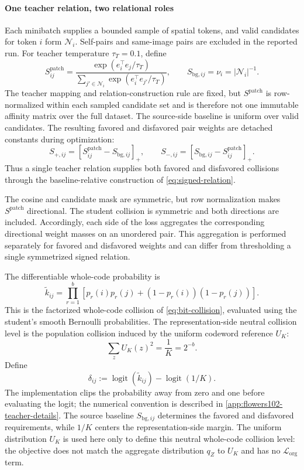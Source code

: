 \paragraph{One teacher relation, two relational roles}
Each minibatch supplies a bounded sample of spatial tokens, and valid candidates for token $i$ form $\mathcal N_i$.
Self-pairs and same-image pairs are excluded in the reported run.
For teacher temperature $\tau_T=0.1$, define
\begin{equation}
S^{\mathrm{patch}}_{ij}
=\frac{\exp(e_i^\top e_j/\tau_T)}
{\sum_{j'\in\mathcal N_i}\exp(e_i^\top e_{j'}/\tau_T)},
\qquad
S_{\mathrm{bg},ij}=\nu_i=|\mathcal N_i|^{-1}.
\label{eq:teacher-row-relation}
\end{equation}
The teacher mapping and relation-construction rule are fixed, but $S^{\mathrm{patch}}$ is row-normalized within each sampled candidate set and is therefore not one immutable affinity matrix over the full dataset.
The source-side baseline is uniform over valid candidates.
The resulting favored and disfavored pair weights are detached constants during optimization:
\begin{equation}
S_{+,ij}=[S^{\mathrm{patch}}_{ij}-S_{\mathrm{bg},ij}]_+,\qquad
S_{-,ij}=[S_{\mathrm{bg},ij}-S^{\mathrm{patch}}_{ij}]_+.
\label{eq:teacher-signed-weights}
\end{equation}
Thus a single teacher relation supplies both favored and disfavored collisions through the baseline-relative construction of \cref{eq:signed-relation}.

The cosine and candidate mask are symmetric, but row normalization makes $S^{\mathrm{patch}}$ directional.
The student collision is symmetric and both directions are included.
Accordingly, each side of the loss aggregates the corresponding directional weight masses on an unordered pair.
This aggregation is performed separately for favored and disfavored weights and can differ from thresholding a single symmetrized signed relation.

The differentiable whole-code probability is
\begin{equation}
\widetilde k_{ij}=\prod_{r=1}^b[p_r(i)p_r(j)+(1-p_r(i))(1-p_r(j))].
\end{equation}
This is the factorized whole-code collision of \cref{eq:bit-collision}, evaluated using the student's smooth Bernoulli probabilities.
The representation-side neutral collision level is the population collision induced by the uniform codeword reference $U_K$:
\[
\sum_z U_K(z)^2=\frac{1}{K}=2^{-b}.
\]
Define
\begin{equation}
\delta_{ij}:=\operatorname{logit}(\widetilde k_{ij})-\operatorname{logit}(1/K).
\label{eq:teacher-centered-margin}
\end{equation}
The implementation clips the probability away from zero and one before evaluating the logit; the numerical convention is described in \ref{app:flowers102-teacher-details}.
The source baseline $S_{\mathrm{bg},ij}$ determines the favored and disfavored requirements, while $1/K$ centers the representation-side margin.
The uniform distribution $U_K$ is used here only to define this neutral whole-code collision level: the objective does not match the aggregate distribution $q_Z$ to $U_K$ and has no $\mathcal L_{\mathrm{org}}$ term.

